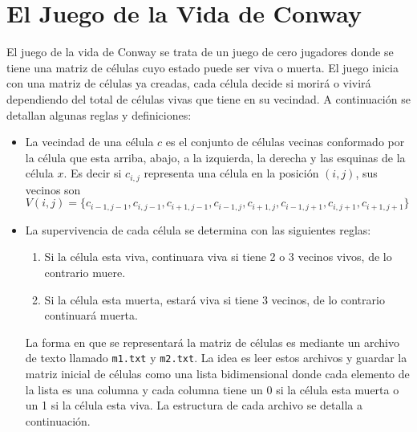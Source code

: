 \section{El Juego de la Vida de Conway}

El juego de la vida de Conway se trata de un juego de cero jugadores donde se tiene una matriz de células cuyo estado puede ser viva o muerta. El juego inicia con una matriz de células ya creadas, cada célula decide si morirá o vivirá dependiendo del total de células vivas que tiene en su vecindad. A continuación se detallan algunas reglas y definiciones:

\begin{itemize}
    \item La vecindad de una célula $c$ es el conjunto de células vecinas conformado por la célula que esta arriba, abajo, a la izquierda, la derecha y las esquinas de la célula $x$. Es decir si $c_{i,j}$ representa una célula en la posición $(i,j)$, sus vecinos son $V(i,j)=\{c_{i-1,j-1}, c_{i,j-1}, c_{i+1,j-1}, c_{i-1,j}, c_{i+1,j}, c_{i-1,j+1}, c_{i,j+1}, c_{i+1,j+1}\}$
    
    \item La supervivencia de cada célula se determina con las siguientes reglas:
    \begin{enumerate}
        \item Si la célula esta viva, continuara viva si tiene 2 o 3 vecinos vivos, de lo contrario muere.
        \item Si la célula esta muerta, estará viva si tiene 3 vecinos, de lo contrario continuará muerta.
    \end{enumerate}
    
    La forma en que se representará la matriz de células es mediante un archivo de texto llamado \texttt{m1.txt} y \texttt{m2.txt}. La idea es leer estos archivos y guardar la matriz inicial de células como una lista bidimensional donde cada elemento de la lista es una columna y cada columna tiene un 0 si la célula esta muerta o un 1 si la célula esta viva. La estructura de cada archivo se detalla a continuación.
    
\end{itemize}
